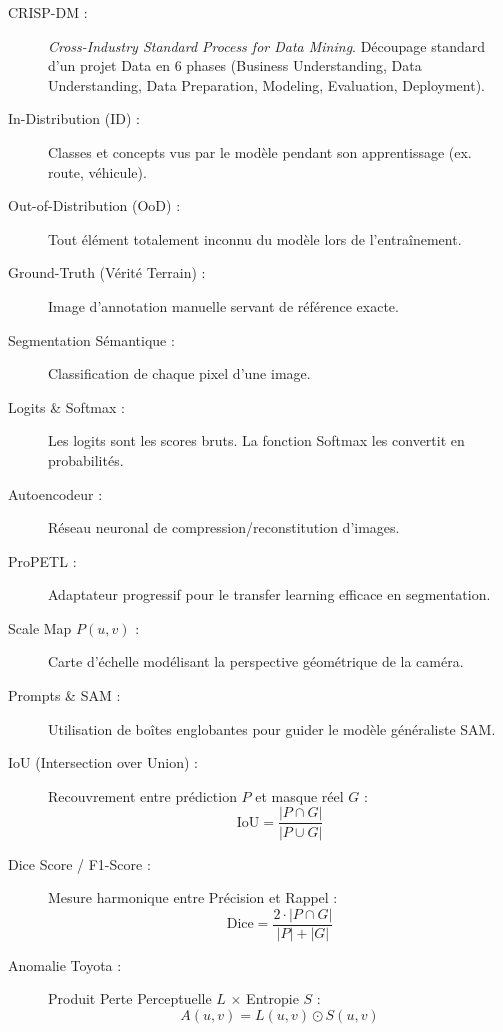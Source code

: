 \documentclass[11pt,a4paper]{article} \usepackage[utf8]{inputenc} \usepackage[T1]{fontenc}
\begin{document}
\begin{tcolorbox}[conceptbox, title=1. Concepts Métier et Méthodologiques]
\begin{description} \item[CRISP-DM \cite{crispdm2026} :] \emph{Cross-Industry Standard Process for Data
Mining}. Découpage standard d'un projet Data en 6 phases (Business Understanding, Data Understanding,
Data Preparation, Modeling, Evaluation, Deployment). \item[In-Distribution (ID) \cite{zhao2024survey} :]
Classes et concepts vus par le modèle pendant son apprentissage (ex. route, véhicule).
\item[Out-of-Distribution (OoD) \cite{zhao2024survey, pixood2024} :] Tout élément totalement inconnu du
modèle lors de l'entraînement. \item[Ground-Truth (Vérité Terrain) \cite{assignment2026,
chan2021segmentmeifyoucan} :] Image d'annotation manuelle servant de référence exacte.
\end{description}
\end{tcolorbox}
\begin{tcolorbox}[conceptbox, title=2. Architectures et Techniques de Deep Learning]
\begin{description} \item[Segmentation Sémantique \cite{zhao2024survey} :] Classification de chaque pixel
d'une image. \item[Logits \& Softmax \cite{zhao2024survey} :] Les logits sont les scores bruts. La
fonction Softmax les convertit en probabilités. \item[Autoencodeur \cite{toyota2024} :] Réseau neuronal
de compression/reconstitution d'images. \item[ProPETL \cite{zhou2024propetl} :] Adaptateur progressif
pour le transfer learning efficace en segmentation. \item[Scale Map $P(u,v)$ \cite{perspective2024} :]
Carte d'échelle modélisant la perspective géométrique de la caméra. \item[Prompts \& SAM \cite{s2m2024}
:] Utilisation de boîtes englobantes pour guider le modèle généraliste SAM.
\end{description}
\end{tcolorbox}
\begin{tcolorbox}[metricbox, title=3. Formules des Métriques d'Évaluation]
\begin{description} \item[IoU (Intersection over Union) \cite{muller2024, chan2021segmentmeifyoucan} :]
Recouvrement entre prédiction $P$ et masque réel $G$ : $$\text{IoU} = \frac{|P \cap G|}{|P \cup G|}$$
\item[Dice Score / F1-Score \cite{muller2024} :] Mesure harmonique entre Précision et Rappel :
$$\text{Dice} = \frac{2 \cdot |P \cap G|}{|P| + |G|}$$ \item[Anomalie Toyota \cite{toyota2024} :] Produit
Perte Perceptuelle $L$ $\times$ Entropie $S$ : $$A(u,v) = L(u,v) \odot S(u,v)$$
\end{description}
\end{tcolorbox}
\end{document}
